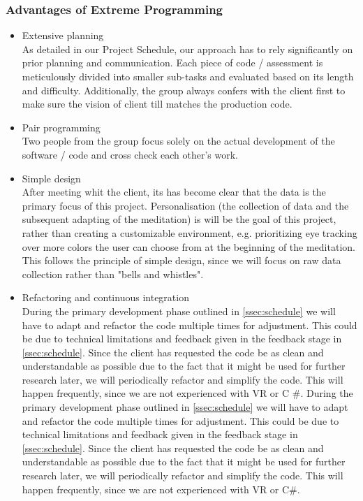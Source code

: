 \documentclass[coverpage,lineno]{../custom}
\begin{document}
\subsubsection{Advantages of Extreme Programming}
\begin{itemize}
    \item Extensive planning \\
    As detailed in our Project Schedule, our approach has to rely significantly on prior planning and communication. Each piece of code / assessment is meticulously divided into smaller sub-tasks and evaluated based on its length and difficulty. Additionally, the group always confers with the client first to make sure the vision of client till matches the production code.
    \item Pair programming \\
    Two people from the group focus solely on the actual development of the software / code and cross check each other's work. 
    \item Simple design \\
    After meeting whit the client, its has become clear that the data is the primary focus of this project. Personalisation (the collection of data and the subsequent adapting of the meditation) is will be the goal of this project, rather than creating a customizable environment, e.g. prioritizing eye tracking over more colors the user can choose from at the beginning of the meditation. This follows the principle of simple design, since we will focus on raw data collection rather than "bells and whistles".
    \item Refactoring and continuous integration \\
     During the primary development phase outlined in \cref{ssec:schedule} we will have to adapt and refactor the code multiple times for adjustment. This could be due to technical limitations and feedback given in the feedback stage in \cref{ssec:schedule}. Since the client has requested the code be as clean and understandable as possible due to the fact that it might be used for further research later, we will periodically refactor and simplify the code. This will happen frequently, since we are not experienced with VR or C \#.
     During the primary development phase outlined in \cref{ssec:schedule} we will have to adapt and refactor the code multiple times for adjustment. This could be due to technical limitations and feedback given in the feedback stage in \cref{ssec:schedule}. Since the client has requested the code be as clean and understandable as possible due to the fact that it might be used for further research later, we will periodically refactor and simplify the code. This will happen frequently, since we are not experienced with VR or C\#.
\end{itemize}
\end{document}
